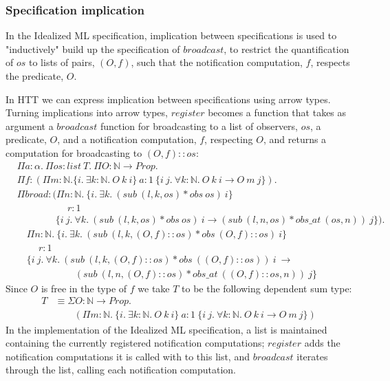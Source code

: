 \documentclass[a4paper,english]{article}
\newcommand{\N}[0]{\mathbb{N}}
\newcommand{\HPROP}[0]{Prop}
\newcommand{\LIST}[0]{list}
\begin{document}
\subsubsection{Specification implication}

In the Idealized ML specification, implication between specifications is used
to "inductively" build up the specification of $broadcast$, to restrict the
quantification of $os$ to lists of pairs, $(O, f)$, such that the notification
computation, $f$, respects the predicate, $O$. 

In HTT we can express implication between specifications using arrow types.
Turning implications into arrow types, $register$ becomes a function that
takes as argument a $broadcast$ function for broadcasting to a list of
observers, $os$, a predicate, $O$, and a notification computation, $f$,
respecting $O$, and returns a computation for broadcasting to $(O, f)::os$:
\begin{align*}
&\Pi a : \alpha.\ \Pi os : \LIST\ T.\ \Pi O : \N \rightarrow \HPROP.\\
&\Pi f : (\Pi m : \N. \{ i.\ \exists k : \N.\ O\ k\ i\}\ a : 1\ \{ i\ j.\ \forall k : \N.\ O\ k\ i \rightarrow O\ m\ j\}).\\
&\Pi broad : (\Pi n : \N.\ \{ i.\ \exists k.\ (sub\ (l, k, os) * obs\ os)\ i \}\\
&\quad\quad\quad\quad\quad \ r : 1\\
&\quad\quad\quad\quad\{ i\ j.\ \forall k.\ (sub\ (l, k, os) * obs\ os)\ i \rightarrow (sub\ (l, n, os) * obs\_at\ (os, n))\ j \}).\\
&\quad\Pi n : \N.\ \{ i.\ \exists k.\ (sub\ (l, k, (O, f)::os) * obs\ (O, f)::os)\ i \}\\
&\quad\quad \ r : 1\\
&\quad\{ i\ j.\ \forall k.\ (sub\ (l, k, (O, f)::os) * obs\ ((O, f)::os))\ i\ \rightarrow\\
&\quad\quad\quad\quad\quad\quad (sub\ (l, n, (O, f)::os) * obs\_at\ ((O, f)::os, n))\ j \}
\end{align*}
Since $O$ is free in the type of $f$ we take $T$ to be the following dependent
sum type:
\begin{align*}
T &\equiv \Sigma O : \N \rightarrow \HPROP.\\
&\quad\quad (\Pi m : \N.\ \{ i.\ \exists k : \N.\ O\ k\ i\}\ a : 1\ \{ i\ j.\ \forall k : \N.\ O\ k\ i \rightarrow O\ m\ j \})
\end{align*}
In the implementation of the Idealized ML specification, a list is maintained
containing the currently registered notification computations; $register$ adds
the notification computations it is called with to this list, and $broadcast$
iterates through the list, calling each notification computation. 
\end{document}
